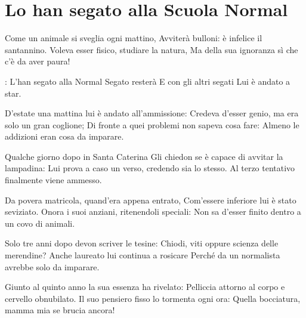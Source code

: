 \section{Lo han segato alla Scuola Normal}
\subtitle{Sulla melodia di “Whiskey in the Jar” dei Dubliners}
\begin{canzone}
Come un animale si sveglia ogni mattino,
Avviterà bulloni: è infelice il santannino.
Voleva esser fisico, studiare la natura,
Ma della sua ignoranza sì che c’è da aver paura!

\ARIT: L’han segato alla Normal
\aritskip Segato resterà
\aritskip E con gli altri segati
\aritskip Lui è andato a star.

D’estate una mattina lui è andato all’ammissione:
Credeva d’esser genio, ma era solo un gran coglione;
Di fronte a quei problemi non sapeva cosa fare:
Almeno le addizioni eran cosa da imparare.

\RIT

Qualche giorno dopo in Santa Caterina
Gli chiedon se è capace di avvitar la lampadina:
Lui prova a caso un verso, credendo sia lo stesso.
Al terzo tentativo finalmente viene ammesso.

\RIT

Da povera matricola, quand’era appena entrato,
Com’essere inferiore lui è stato seviziato.
Onora i suoi anziani, ritenendoli speciali:
Non sa d’esser finito dentro a un covo di animali.

\RIT

Solo tre anni dopo devon scriver le tesine:
Chiodi, viti oppure scienza delle merendine?
Anche laureato lui continua a rosicare
Perché da un normalista avrebbe solo da imparare.

\RIT

Giunto al quinto anno la sua essenza ha rivelato:
Pelliccia attorno al corpo e cervello obnubilato.
Il suo pensiero fisso lo tormenta ogni ora:
Quella bocciatura, mamma mia se brucia ancora!

\RITB
\end{canzone}
